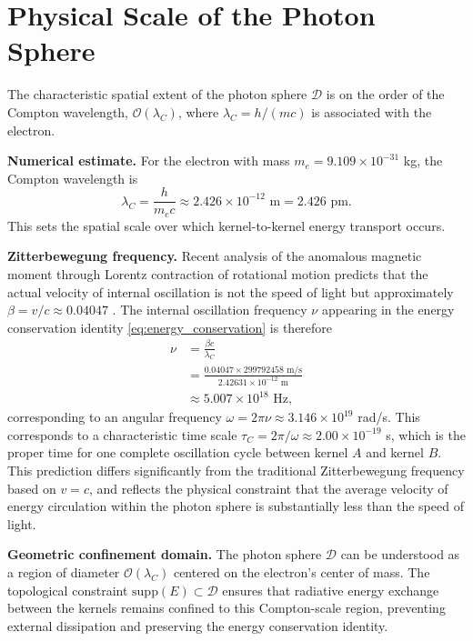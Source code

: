 \documentclass[%
 reprint,
 amsmath,amssymb,
 aps,
 prb,
]{revtex4-2}
\numberwithin{equation}{section}
\begin{document}
\section{Physical Scale of the Photon Sphere}
\label{sec:appendix_physical_scale}

The characteristic spatial extent of the photon sphere $\mathcal{D}$ is on the order of the Compton wavelength, $\mathcal{O}(\lambda_C)$, where $\lambda_C = h/(mc)$ is associated with the electron.

\medskip
\noindent\textbf{Numerical estimate.}
For the electron with mass $m_e = 9.109 \times 10^{-31}$ kg, the Compton wavelength is
\begin{equation}
\lambda_C = \frac{h}{m_e c} \approx 2.426 \times 10^{-12} \text{ m} = 2.426 \text{ pm}.
\end{equation}
This sets the spatial scale over which kernel-to-kernel energy transport occurs.

\medskip
\noindent\textbf{Zitterbewegung frequency.}
Recent analysis of the anomalous magnetic moment through Lorentz contraction of rotational motion predicts that the actual velocity of internal oscillation is not the speed of light but approximately $\beta = v/c \approx 0.04047$ \cite{hanamura17764997}.
The internal oscillation frequency $\nu$ appearing in the energy conservation identity \eqref{eq:energy_conservation} is therefore
\begin{equation}
\begin{split}
\nu &= \frac{\beta c}{\lambda_C} \\
    &= \frac{0.04047 \times 299792458 \text{ m/s}}{2.42631 \times 10^{-12} \text{ m}} \\
    &\approx 5.007 \times 10^{18} \text{ Hz},
\end{split}
\end{equation}
corresponding to an angular frequency $\omega = 2\pi\nu \approx 3.146 \times 10^{19}$ rad/s.
This corresponds to a characteristic time scale $\tau_C = 2\pi/\omega \approx 2.00 \times 10^{-19}$ s, which is the proper time for one complete oscillation cycle between kernel $A$ and kernel $B$.
This prediction differs significantly from the traditional Zitterbewegung frequency based on $v = c$, and reflects the physical constraint that the average velocity of energy circulation within the photon sphere is substantially less than the speed of light.

\medskip
\noindent\textbf{Geometric confinement domain.}
The photon sphere $\mathcal{D}$ can be understood as a region of diameter $\mathcal{O}(\lambda_C)$ centered on the electron's center of mass. The topological constraint $\mathrm{supp}(E) \subset \mathcal{D}$ ensures that radiative energy exchange between the kernels remains confined to this Compton-scale region, preventing external dissipation and preserving the energy conservation identity.
\end{document}
